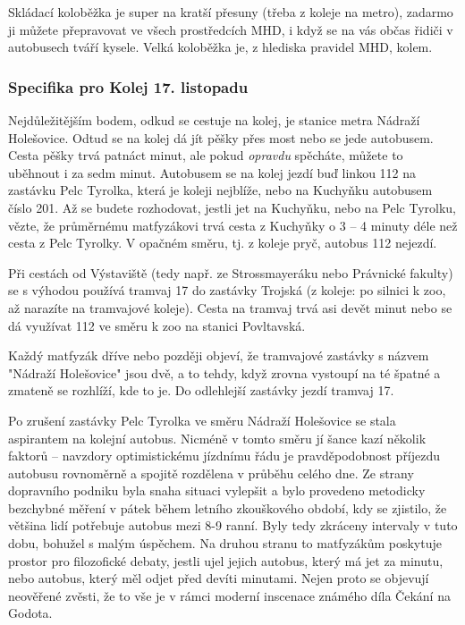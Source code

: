 Skládací koloběžka je super na kratší přesuny (třeba z koleje na metro), zadarmo
ji můžete přepravovat ve všech prostředcích MHD, i když se na vás občas řidiči v
autobusech tváří kysele. Velká koloběžka je, z hlediska pravidel MHD, kolem.


\subsubsection{Specifika pro Kolej 17. listopadu}
Nejdůležitějším bodem, odkud se cestuje na kolej, je stanice metra Nádraží
Holešovice. Odtud se na kolej dá jít pěšky přes most nebo se jede autobusem.
Cesta pěšky trvá patnáct minut, ale pokud \textit{opravdu} spěcháte, můžete to
uběhnout i za sedm minut. Autobusem se na kolej jezdí buď linkou 112 na zastávku
Pelc Tyrolka, která je koleji nejblíže, nebo na Kuchyňku autobusem číslo 201. Až
se budete rozhodovat, jestli jet na Kuchyňku, nebo na Pelc Tyrolku, vězte, že
průměrnému matfyzákovi trvá cesta z Kuchyňky o 3 – 4 minuty déle než cesta z
Pelc Tyrolky. V opačném směru, tj. z koleje pryč, autobus 112 nejezdí.

Při cestách od Výstaviště (tedy např. ze Strossmayeráku nebo Právnické fakulty)
se s výhodou používá tramvaj 17 do zastávky Trojská (z koleje: po silnici k zoo,
až narazíte na tramvajové koleje). Cesta na tramvaj trvá asi devět minut nebo se
dá využívat 112 ve směru k zoo na stanici Povltavská.

Každý matfyzák dříve nebo později objeví, že tramvajové zastávky s názvem
"Nádraží Holešovice" jsou dvě, a to tehdy, když zrovna vystoupí na té špatné a
zmateně se rozhlíží, kde to je. Do odlehlejší zastávky jezdí tramvaj 17.

Po zrušení zastávky Pelc Tyrolka ve směru Nádraží Holešovice se stala aspirantem
na kolejní autobus. Nicméně v tomto směru jí šance kazí několik faktorů –
navzdory optimistickému jízdnímu řádu je pravděpodobnost příjezdu autobusu
rovnoměrně a spojitě rozdělena v průběhu celého dne. Ze strany dopravního
podniku byla snaha situaci vylepšit a bylo provedeno metodicky bezchybné měření
v pátek během letního zkouškového období, kdy se zjistilo, že většina lidí
potřebuje autobus mezi 8-9 ranní. Byly tedy zkráceny intervaly v tuto dobu,
bohužel s malým úspěchem. Na druhou stranu to matfyzákům poskytuje prostor pro
filozofické debaty, jestli ujel jejich autobus, který má jet za minutu, nebo
autobus, který měl odjet před devíti minutami. Nejen proto se objevují neověřené
zvěsti, že to vše je v rámci moderní inscenace známého díla Čekání na Godota.

